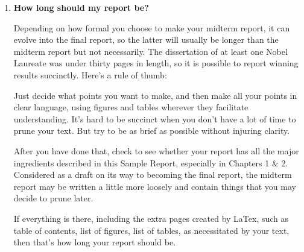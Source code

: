 \begin{enumerate}
\begin{quote}
Since non-floating figures can produce large sections of vertical whitespace, non-
floating figures are generally considered poor typesetting style. Instead, users are
strongly encouraged to use the figure environment’s \verb#[!ht]# optional argument which
moves the figure only if there is not enough room for it on the current page.
\end{quote}

\hspace{15pt}See the internet for other solutions, e.g., for fixing  gross placement errors using
 commands like:
{\verb#\raggedbottom, \baselinestretch, \parskip#}.

\item {\bf How long should my report be?}

Depending on how formal you choose to make your midterm report, it can evolve into the final report, so the latter will usually be longer than the midterm report but not necessarily.  
The dissertation of at least one Nobel Laureate was under thirty pages in length, so it is possible to report winning results succinctly.
Here's a rule of thumb:

\hspace{15pt}Just decide what points you want to make, and then make all your points in clear language, using figures and tables wherever they facilitate understanding. 
It's hard to be succinct when you don't have a lot of time to prune your text.
But try to be as brief as possible without injuring clarity.

\hspace{15pt}After you have done that, check to see whether your report has all the major ingredients described in this Sample Report, especially in Chapters 1 \& 2.
Considered as a draft on its way to becoming the final report, the midterm report may be written a little more loosely and contain things that you may decide to prune later.

\hspace{15pt}If everything is there, including the extra pages created by LaTex, such as table of contents, list of figures, list of tables, as necessitated by your text, then that's how long your report should be.

\end{enumerate}


\endinput
